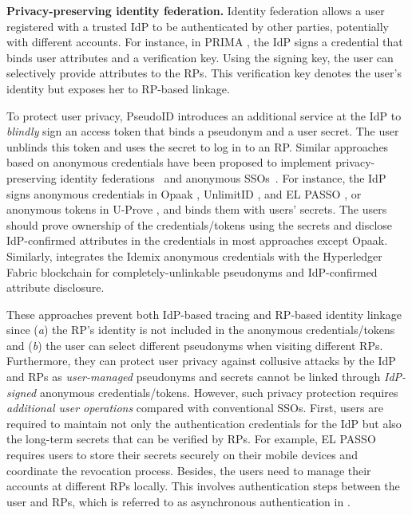 \noindent\textbf{Privacy-preserving identity federation.} Identity federation allows a user registered with a trusted IdP to be authenticated by other parties, potentially with different accounts. For instance, in PRIMA \cite{prima}, the IdP signs a credential 
that binds user attributes and a verification key. Using the signing key, the user can selectively provide attributes to the RPs. %
This verification key denotes the user's identity but exposes her to RP-based linkage. 

To protect user privacy, PseudoID \cite{PseudoID} introduces an additional service at the IdP to \emph{blindly} sign %
an access token that binds a pseudonym and a user secret. The user unblinds this token and uses the secret to log in to an RP. Similar approaches based on anonymous credentials \cite{anon-credential-2001, idemix, anon-credential} have been proposed to implement privacy-preserving identity federations~\cite{PseudoID, hyperledge-idemix, Opaak, uprov, UnlimitID} and anonymous SSOs~\cite{ELPASSO}. For instance, the IdP signs anonymous credentials in Opaak \cite{Opaak}, UnlimitID \cite{UnlimitID}, and EL PASSO \cite{ELPASSO}, or anonymous tokens in U-Prove \cite{uprov,uprove-conference}, and binds them with users' secrets. %
The users should prove ownership of the credentials/tokens using the secrets and disclose IdP-confirmed attributes in the credentials in most approaches except Opaak. Similarly, \cite{hyperledge-idemix} integrates the Idemix anonymous credentials \cite{idemix} with the Hyperledger Fabric blockchain for completely-unlinkable pseudonyms and IdP-confirmed attribute disclosure.

These approaches prevent both IdP-based tracing and RP-based identity linkage since (\emph{a}) the RP's identity is not included in the anonymous credentials/tokens and (\emph{b}) the user can select different pseudonyms when visiting different RPs. Furthermore, they can protect user privacy against collusive attacks by the IdP and RPs as \emph{user-managed} pseudonyms and secrets cannot be linked through \emph{IdP-signed} anonymous credentials/tokens. 
However, such privacy protection requires \emph{additional user operations} compared with conventional SSOs. First, users are required to maintain not only the authentication credentials for the IdP but also the long-term secrets that can be verified by RPs. For example, EL PASSO \cite{ELPASSO} requires users to store their secrets securely on their mobile devices and coordinate the revocation process. Besides, the users need to manage their accounts at different RPs locally. This involves authentication steps between the user and RPs, which is referred to as asynchronous authentication in \cite{ELPASSO}.

